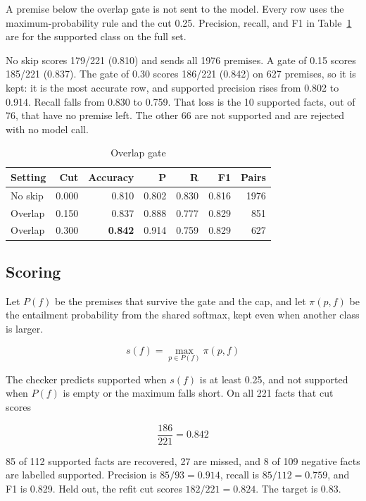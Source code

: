 A premise below the overlap gate is not sent to the model. Every row uses the maximum-probability rule and the cut 0.25. Precision, recall, and F1 in Table~\ref{tab:prune} are for the supported class on the full set.

No skip scores 179/221 (0.810) and sends all 1976 premises. A gate of 0.15 scores 185/221 (0.837). The gate of 0.30 scores 186/221 (0.842) on 627 premises, so it is kept: it is the most accurate row, and supported precision rises from 0.802 to 0.914. Recall falls from 0.830 to 0.759. That loss is the 10 supported facts, out of 76, that have no premise left. The other 66 are not supported and are rejected with no model call.

\begin{table}[H]
\centering
\caption{Overlap gate}
\label{tab:prune}
\small
\begin{tabular}{@{}lrrrrrr@{}}
\toprule
Setting & Cut & Accuracy & P & R & F1 & Pairs \\
\midrule
No skip & 0.000 & 0.810 & 0.802 & 0.830 & 0.816 & 1976 \\
Overlap & 0.150 & 0.837 & 0.888 & 0.777 & 0.829 & 851 \\
Overlap & 0.300 & \textbf{0.842} & 0.914 & 0.759 & 0.829 & 627 \\
\bottomrule
\end{tabular}
\end{table}

\subsection{Scoring}

Let \(P(f)\) be the premises that survive the gate and the cap, and let \(\pi(p,f)\) be the entailment probability from the shared softmax, kept even when another class is larger.

\begin{equation}
s(f)=\max_{p\in P(f)}\pi(p,f)
\end{equation}

The checker predicts supported when \(s(f)\) is at least 0.25, and not supported when \(P(f)\) is empty or the maximum falls short. On all 221 facts that cut scores

\[
\frac{186}{221}=0.842
\]

85 of 112 supported facts are recovered, 27 are missed, and 8 of 109 negative facts are labelled supported. Precision is \(85/93=0.914\), recall is \(85/112=0.759\), and F1 is 0.829. Held out, the refit cut scores \(182/221=0.824\). The target is 0.83.

